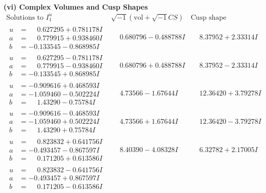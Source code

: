 \documentclass[1p]{elsarticle_modified}
\theoremstyle{definition}
\newcommand{\I}{\sqrt{-1}}
\begin{document}
\newpage\flushleft \textbf{(vi) Complex Volumes and Cusp Shapes}
$$\begin{array}{c|c|c}  
\text{Solutions to }I^u_{1}& \I (\text{vol} + \sqrt{-1}CS) & \text{Cusp shape}\\
 \hline 
\begin{aligned}
u &= \phantom{-}0.627295 + 0.781178 I \\
a &= \phantom{-}0.779915 + 0.938460 I \\
b &= -0.133545 - 0.868985 I\end{aligned}
 & \phantom{-}0.680796 - 0.488788 I & \phantom{-}8.37952 + 2.33314 I \\ \hline\begin{aligned}
u &= \phantom{-}0.627295 - 0.781178 I \\
a &= \phantom{-}0.779915 - 0.938460 I \\
b &= -0.133545 + 0.868985 I\end{aligned}
 & \phantom{-}0.680796 + 0.488788 I & \phantom{-}8.37952 - 2.33314 I \\ \hline\begin{aligned}
u &= -0.909616 + 0.468593 I \\
a &= -1.059460 - 0.502224 I \\
b &= \phantom{-}1.43290 - 0.75784 I\end{aligned}
 & \phantom{-}4.73566 - 1.67644 I & \phantom{-}12.36420 + 3.79278 I \\ \hline\begin{aligned}
u &= -0.909616 - 0.468593 I \\
a &= -1.059460 + 0.502224 I \\
b &= \phantom{-}1.43290 + 0.75784 I\end{aligned}
 & \phantom{-}4.73566 + 1.67644 I & \phantom{-}12.36420 - 3.79278 I \\ \hline\begin{aligned}
u &= \phantom{-}0.823832 + 0.641756 I \\
a &= -0.493457 - 0.867597 I \\
b &= \phantom{-}0.171205 + 0.613586 I\end{aligned}
 & \phantom{-}8.40390 - 4.08328 I & \phantom{-}6.32782 + 2.17005 I \\ \hline\begin{aligned}
u &= \phantom{-}0.823832 - 0.641756 I \\
a &= -0.493457 + 0.867597 I \\
b &= \phantom{-}0.171205 - 0.613586 I\end{aligned}

\end{array}$$
\end{document}
